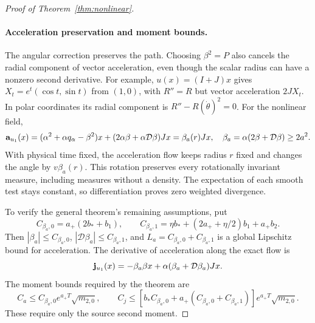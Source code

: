 \begin{proof}[Proof of Theorem~\ref{thm:nonlinear}]
\paragraph{Acceleration preservation and moment bounds.}
The angular correction preserves the path. Choosing $\beta^2=P$ also cancels the radial component of vector acceleration, even though the scalar radius can have a nonzero second derivative. For example, $u(x)=(I+J)x$ gives $X_t=e^t(\cos t,\sin t)$ from $(1,0)$, with $R''=R$ but vector acceleration $2JX_t$. In polar coordinates its radial component is $R''-R(\dot\theta)^2=0$. For the nonlinear field,
\begin{equation}
 \mathbf a_{u_1}(x)=(\alpha^2+\alpha q_\alpha-\beta^2)x+
 (2\alpha\beta+\alpha \mathcal D \beta)Jx=\beta_a(r)Jx,
 \quad\beta_a=\alpha(2\beta+\mathcal D \beta)\ge2a^2.
 \label{eq:nonlinear-acceleration-full}
\end{equation}
With physical time fixed, the acceleration flow keeps radius $r$ fixed and changes the angle by $v\beta_a(r)$. This rotation preserves every rotationally invariant measure, including measures without a density. The expectation of each smooth test stays constant, so differentiation proves zero weighted divergence.

To verify the general theorem's remaining assumptions, put
\[
 C_{\beta_a,0}=a_+(2b_*+b_1),\qquad
 C_{\beta_a,1}=\eta b_*+(2a_++\eta/2)b_1+a_+b_2.
\]
Then $|\beta_a|\le C_{\beta_a,0}$, $|\mathcal D \beta_a|\le C_{\beta_a,1}$, and $L_a=C_{\beta_a,0}+C_{\beta_a,1}$ is a global Lipschitz bound for acceleration. The derivative of acceleration along the exact flow is
\[
 \mathbf j_{u_1}(x)=-\beta_a\beta x+\alpha(\beta_a+\mathcal D \beta_a)Jx.
\]
The moment bounds required by the theorem are
\[
 C_a\le C_{\beta_a,0}e^{a_+T}\sqrt{m_{2,0}},\qquad
 C_j\le[b_*C_{\beta_a,0}+a_+(C_{\beta_a,0}+C_{\beta_a,1})]e^{a_+T}\sqrt{m_{2,0}}.
\]
These require only the source second moment.


\end{proof}
